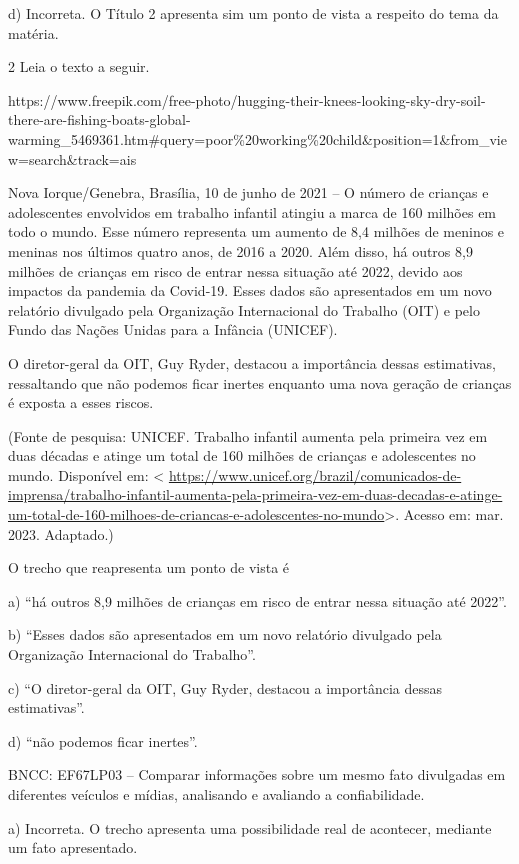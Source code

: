d) Incorreta. O Título 2 apresenta sim um ponto de vista a respeito do
tema da matéria.

\num{2} Leia o texto a seguir.

https://www.freepik.com/free-photo/hugging-their-knees-looking-sky-dry-soil-there-are-fishing-boats-global-warming\_5469361.htm\#query=poor\%20working\%20child\&position=1\&from\_view=search\&track=ais

Nova Iorque/Genebra, Brasília, 10 de junho de 2021 -- O número de
crianças e adolescentes envolvidos em trabalho infantil atingiu a marca
de 160 milhões em todo o mundo. Esse número representa um aumento de 8,4
milhões de meninos e meninas nos últimos quatro anos, de 2016 a 2020.
Além disso, há outros 8,9 milhões de crianças em risco de entrar nessa
situação até 2022, devido aos impactos da pandemia da Covid-19. Esses
dados são apresentados em um novo relatório divulgado pela Organização
Internacional do Trabalho (OIT) e pelo Fundo das Nações Unidas para a
Infância (UNICEF).

O diretor-geral da OIT, Guy Ryder, destacou a importância dessas
estimativas, ressaltando que não podemos ficar inertes enquanto uma nova
geração de crianças é exposta a esses riscos.

(Fonte de pesquisa: UNICEF. Trabalho infantil aumenta pela primeira vez
em duas décadas e atinge um total de 160 milhões de crianças e
adolescentes no mundo. Disponível em: \textless{}
\url{https://www.unicef.org/brazil/comunicados-de-imprensa/trabalho-infantil-aumenta-pela-primeira-vez-em-duas-decadas-e-atinge-um-total-de-160-milhoes-de-criancas-e-adolescentes-no-mundo}\textgreater.
Acesso em: mar. 2023. Adaptado.)

O trecho que reapresenta um ponto de vista é

a) ``há outros 8,9 milhões de crianças em risco de entrar nessa situação
até 2022''.

b) ``Esses dados são apresentados em um novo relatório divulgado pela
Organização Internacional do Trabalho''.

c) ``O diretor-geral da OIT, Guy Ryder, destacou a importância dessas
estimativas''.

d) ``não podemos ficar inertes''.

BNCC: EF67LP03 -- Comparar informações sobre um mesmo fato divulgadas em
diferentes veículos e mídias, analisando e avaliando a confiabilidade.

a) Incorreta. O trecho apresenta uma possibilidade real de acontecer,
mediante um fato apresentado.

